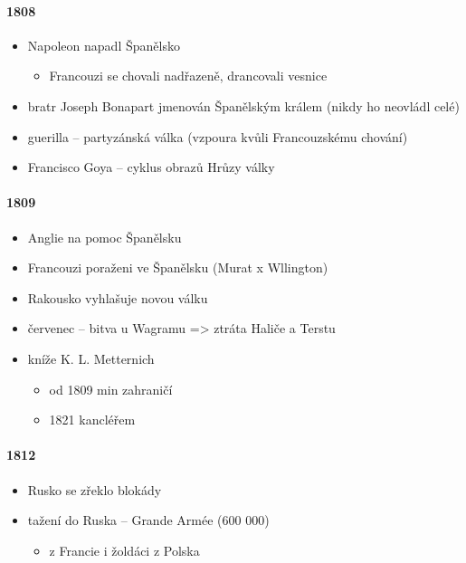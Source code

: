 \paragraph{1808}
\begin{itemize}
\item Napoleon napadl Španělsko
	\begin{itemize}
	\item Francouzi se chovali nadřazeně, drancovali vesnice
	\end{itemize}
\item bratr Joseph Bonapart jmenován Španělským králem (nikdy ho neovládl celé)
\item guerilla -- partyzánská válka (vzpoura kvůli Francouzskému chování)
\item Francisco Goya -- cyklus obrazů Hrůzy války
\end{itemize}

\paragraph{1809}
\begin{itemize}
\item Anglie na pomoc Španělsku
\item Francouzi poraženi ve Španělsku (Murat x Wllington)
\item Rakousko vyhlašuje novou válku
\item červenec -- bitva u Wagramu => ztráta Haliče a Terstu
\item kníže K. L. Metternich 
	\begin{itemize}
	\item od 1809 min zahraničí
	\item 1821 kancléřem
	\end{itemize}
\end{itemize}

\paragraph{1812}
\begin{itemize}
\item Rusko se zřeklo blokády
\item[\ra] tažení do Ruska -- Grande Armée (600 000)
	\begin{itemize}
	\item z Francie i žoldáci z Polska
	\end{itemize}
\end{itemize}

